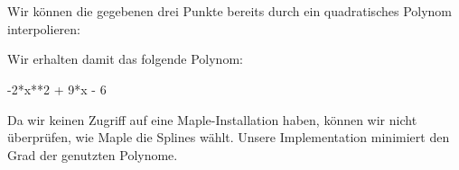 \section{}

Wir können die gegebenen drei Punkte bereits durch ein quadratisches Polynom interpolieren:



Wir erhalten damit das folgende Polynom:

\begin{consoleoutput}
-2*x**2 + 9*x - 6
\end{consoleoutput}

Da wir keinen Zugriff auf eine Maple-Installation haben, können wir nicht überprüfen, wie Maple die Splines wählt.
Unsere Implementation minimiert den Grad der genutzten Polynome.
